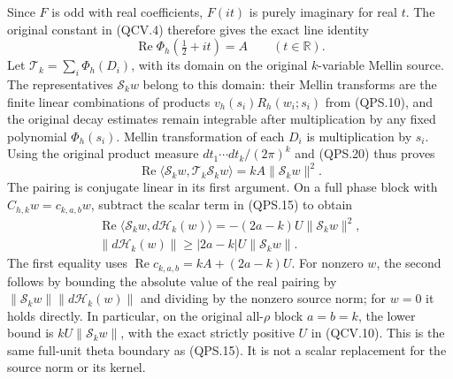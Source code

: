 Since \(F\) is odd with real coefficients, \(F(it)\) is purely
imaginary for real \(t\). The original constant in (QCV.4) therefore
gives the exact line identity
\[
 \operatorname{Re}\Phi_h(\tfrac12+it)=A
                     \qquad(t\in\mathbb R).
 \tag{QPS.20}
\]
Let \(\mathcal T_k=\sum_i\Phi_h(D_i)\), with its domain on the
original \(k\)-variable Mellin source. The representatives
\(\mathcal S_k w\) belong to this domain: their Mellin transforms
are the finite linear combinations of products
\(v_h(s_i)R_h(w_i;s_i)\) from (QPS.10), and the original decay
estimates remain integrable after multiplication by any fixed
polynomial \(\Phi_h(s_i)\).
Mellin transformation of each \(D_i\) is multiplication by \(s_i\).
Using the original product measure \(dt_1\cdots dt_k/(2\pi)^k\)
and (QPS.20) thus proves
\[
 \operatorname{Re}
 \langle\mathcal S_k w,\mathcal T_k\mathcal S_k w\rangle
     =kA\|\mathcal S_k w\|^2.
 \tag{QPS.21}
\]
The pairing is conjugate linear in its first argument.
On a full phase block with \(C_{h,k}w=c_{k,a,b}w\), subtract
the scalar term in (QPS.15) to obtain
\[
 \begin{gathered}
 \operatorname{Re}
 \langle\mathcal S_k w,d\mathcal H_k(w)\rangle
       =-(2a-k)U\|\mathcal S_k w\|^2,\\
 \|d\mathcal H_k(w)\|
       \geq |2a-k|U\|\mathcal S_k w\|.
 \end{gathered}
 \tag{QPS.22}
\]
The first equality uses
\(\operatorname{Re}c_{k,a,b}=kA+(2a-k)U\). For nonzero \(w\),
the second follows by bounding the absolute value of the real
pairing by
\(\|\mathcal S_k w\|\|d\mathcal H_k(w)\|\) and dividing by the
nonzero source norm; for \(w=0\) it holds directly. In particular,
on the original all-\(\rho\) block \(a=b=k\), the lower bound is
\(kU\|\mathcal S_k w\|\), with the exact strictly positive \(U\)
in (QCV.10). This is the same full-unit theta boundary as (QPS.15).
It is not a scalar replacement for the source norm or its kernel.

